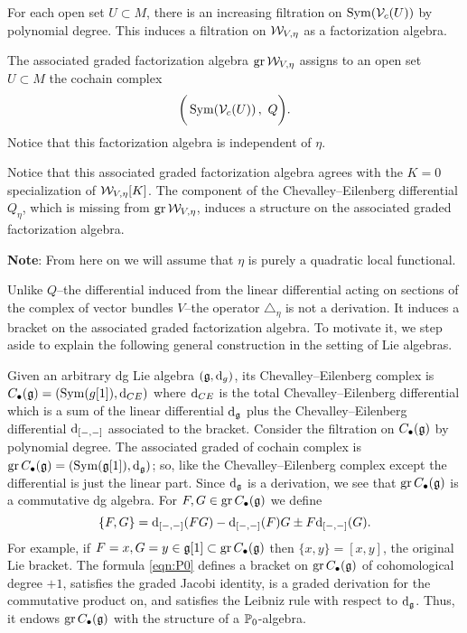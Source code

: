 \documentclass[11pt]{amsart}
\renewcommand{\op}{\operatorname}
\begin{document}
For each open set $U \subset M$, there is an increasing filtration on $\operatorname{Sym}(\mathcal V_c(U))$ by polynomial degree. 
This induces a filtration on $\mathcal W_{V,\eta}$ as a factorization algebra.
\begin{prop}
The associated graded factorization algebra $\op{gr} \cW_{V,\eta}$ assigns to an open set $U \subset M$ the cochain complex
\begin{equation}
 \bigg(\operatorname{Sym}(\mathcal V_c(U)) \,, \, \,Q \bigg) .
\end{equation}
Notice that this factorization algebra is independent of $\eta$.
\end{prop}

Notice that this associated graded factorization algebra agrees with the $K=0$ specialization of $\mathcal W_{V,\eta}[K]$.
The component of the Chevalley--Eilenberg differential $Q_\eta$, which is missing from $\op{gr} \cW_{V,\eta}$,  induces a structure on the associated graded factorization algebra.

\textbf{Note}: From here on we will assume that $\eta$ is purely a quadratic local functional.

Unlike $Q$--the differential induced from the linear differential acting on sections of the complex of vector bundles $V$--the operator $\triangle_\eta$ is not a derivation.
It induces a bracket on the associated graded factorization algebra.
To motivate it, we step aside to explain the following general construction in the setting of Lie algebras.

Given an arbitrary dg Lie algebra $(\mathfrak{g},{\rm d}_g)$, its Chevalley--Eilenberg complex is $C_\bullet(\mathfrak{g}) = \left(\operatorname{Sym}(g[1]), {\rm d}_{CE}\right)$ where ${\rm d}_{CE}$ is the total Chevalley--Eilenberg differential which is a sum of the linear differential ${\rm d}_{\mathfrak{g}}$ plus the Chevalley--Eilenberg differential ${\rm d}_{[-,-]}$ associated to the bracket.
Consider the filtration on $C_\bullet(\mathfrak{g})$ by polynomial degree. 
The associated graded of cochain complex is $\op{gr} C_\bu(\lie{g}) = (\Sym(\lie{g}[1]) , \d_{\lie{g}})$; so, like the Chevalley--Eilenberg complex except the differential is just the linear part.
Since ${\rm d}_{\mathfrak{g}}$ is a derivation, we see that $\op{gr} C_\bu(\lie{g})$ is a commutative dg algebra.
For $F,G \in \op{gr} C_\bu(\lie{g})$ we define
\begin{equation}\label{eqn:P0}
\{F,G\} = {\rm d}_{[-,-]} (FG) - {\rm d}_{[-,-]} (F) G \pm F {\rm d}_{[-,-]} (G) .
\end{equation}
For example, if $F = x, G = y \in \lie{g}[1] \subset \op{gr} C_\bu(\lie{g})$ then $\{x,y\} = [x,y]$, the original Lie bracket.
The formula \eqref{eqn:P0} defines a bracket on $\op{gr} C_\bu(\lie{g})$ of cohomological degree $+1$, satisfies the graded Jacobi identity, is a graded derivation for the commutative product on,  and satisfies the Leibniz rule with respect to ${\rm d}_{\mathfrak{g}}$.
Thus, it endows $\op{gr} C_\bu(\lie{g})$ with the structure of a $\mathbb P_0$-algebra.
\end{document}
